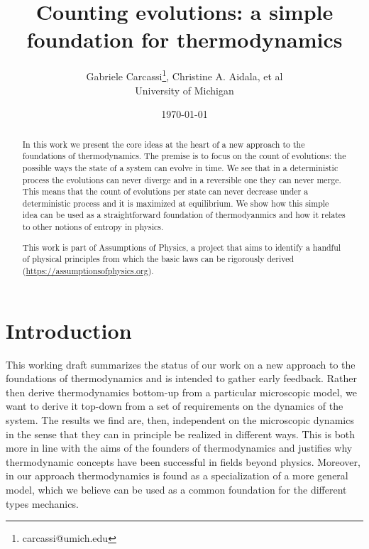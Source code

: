 \documentclass[letterpaper,twocolumn]{article}
\begin{document}
\title{Counting evolutions: a simple foundation for thermodynamics}
\author{Gabriele Carcassi\footnote{carcassi@umich.edu}, Christine A. Aidala, et al \\ University of Michigan}

\date{\today}

\maketitle

\begin{abstract}
	In this work we present the core ideas at the heart of a new approach to the foundations of thermodynamics. The premise is to focus on the count of evolutions: the possible ways the state of a system can evolve in time. We see that in a deterministic process the evolutions can never diverge and in a reversible one they can never merge. This means that the count of evolutions per state can never decrease under a deterministic process and it is maximized at equilibrium. We show how this simple idea can be used as a straightforward foundation of thermodyanmics and how it relates to other notions of entropy in physics.
	
	This work is part of Assumptions of Physics, a project that aims to identify a handful of physical principles from which the basic laws can be rigorously derived  (\url{https://assumptionsofphysics.org}).
\end{abstract}


\section{Introduction}

This working draft summarizes the status of our work on a new approach to the foundations of thermodynamics and is intended to gather early feedback. Rather then derive thermodynamics bottom-up from a particular microscopic model, we want to derive it top-down from a set of requirements on the dynamics of the system. The results we find are, then, independent on the microscopic dynamics in the sense that they can in principle be realized in different ways. This is both more in line with the aims of the founders of thermodynamics and justifies why thermodynamic concepts have been successful in fields beyond physics. Moreover, in our approach thermodynamics is found as a specialization of a more general model, which we believe can be used as a common foundation for the different types mechanics.
\end{document}
